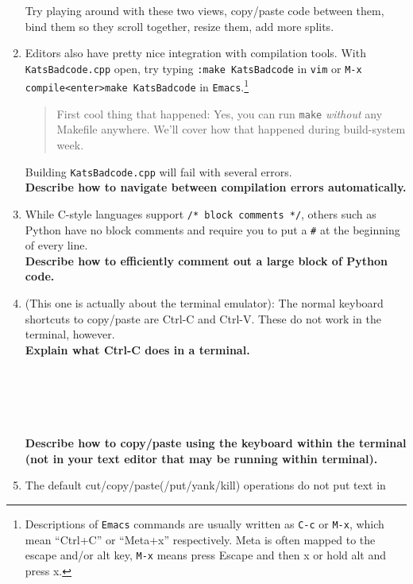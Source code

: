 \documentclass{article}
\begin{document}
\begin{enumerate}
    Try playing around with these two views, copy/paste code between them,
    bind them so they scroll together, resize them, add more splits.\\
  \item Editors also have pretty nice integration with compilation tools. With
    \texttt{KatsBadcode.cpp} open, try typing \texttt{:make KatsBadcode} in
    \texttt{vim} or \texttt{M-x compile<enter>make KatsBadcode} in
    \texttt{Emacs}.\footnote{
      Descriptions of \texttt{Emacs} commands are usually written as
      \texttt{C-c} or \texttt{M-x}, which mean ``Ctrl+C'' or ``Meta+x''
      respectively. Meta is often mapped to the escape and/or alt key,
      \texttt{M-x} means press Escape and then x or hold alt and press x.
    }
    \begin{quote}
      First cool thing that happened: Yes, you can run \texttt{make}
      \emph{without} any Makefile anywhere. We'll cover how that happened
      during build-system week.
    \end{quote}
    Building \texttt{KatsBadcode.cpp} will fail with several errors.\\
    \textbf{Describe how to navigate between compilation errors automatically.}
    \vspace{6em}
  \item While C-style languages support \texttt{/* block comments */}, others
    such as Python have no block comments and require you to put a \texttt{\#}
    at the beginning of every line.\\
    \textbf{Describe how to efficiently comment out a large block of Python code.}
    \vspace{6em}
  \item (This one is actually about the terminal emulator): The normal
    keyboard shortcuts to copy/paste are Ctrl-C and Ctrl-V. These do not work
    in the terminal, however.\\
    \textbf{Explain what Ctrl-C does in a terminal.}\\
    ~\\
    ~\\
    ~\\
    ~\\
    ~\\
    \textbf{Describe how to copy/paste using the keyboard within the terminal (not
    in your text editor that may be running within terminal).}
    \vspace{6em}
  \item The default cut/copy/paste(/put/yank/kill) operations do not put text in

\end{enumerate}
\end{document}
